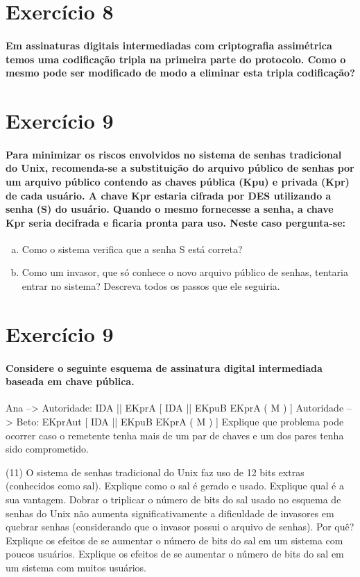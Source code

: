 \documentclass[10pt,a4paper]{report}
\begin{document}
\section*{Exercício 8}
\paragraph{ Em assinaturas digitais intermediadas com criptografia assimétrica temos uma codificação tripla na primeira parte do protocolo. Como o mesmo pode ser modificado de modo a eliminar esta tripla codificação?}

\section*{Exercício 9}
\paragraph{ Para minimizar os riscos envolvidos no sistema de senhas tradicional do Unix, recomenda-se a substituição do arquivo público de senhas por um arquivo público contendo as chaves pública (Kpu) e privada (Kpr) de cada usuário. A chave Kpr estaria cifrada por DES utilizando a senha (S) do usuário. Quando o mesmo fornecesse a senha, a chave Kpr seria decifrada e ficaria pronta para uso. Neste caso pergunta-se:}
\begin{enumerate}[(a)]
\item Como o sistema verifica que a senha S está correta?
\item Como um invasor, que só conhece o novo arquivo público de senhas, tentaria entrar no sistema? Descreva todos os passos que ele seguiria.
\end{enumerate}
\section*{Exercício 9}
\paragraph{ Considere o seguinte esquema de assinatura digital intermediada baseada em chave pública.}
Ana --> Autoridade: IDA || EKprA [ IDA || EKpuB { EKprA ( M ) } ]
Autoridade --> Beto: EKprAut [ IDA || EKpuB { EKprA ( M ) } ]
Explique que problema pode ocorrer caso o remetente tenha mais de um par de chaves e um dos pares tenha sido comprometido.

(11) O sistema de senhas tradicional do Unix faz uso de 12 bits extras (conhecidos como sal).
Explique como o sal é gerado e usado.
Explique qual é a sua vantagem.
Dobrar o triplicar o número de bits do sal usado no esquema de senhas do Unix não aumenta significativamente a dificuldade de invasores em quebrar senhas (considerando que o invasor possui o arquivo de senhas). Por quê?
Explique os efeitos de se aumentar o número de bits do sal em um sistema com poucos usuários.
Explique os efeitos de se aumentar o número de bits do sal em um sistema com muitos usuários.
\end{document}
